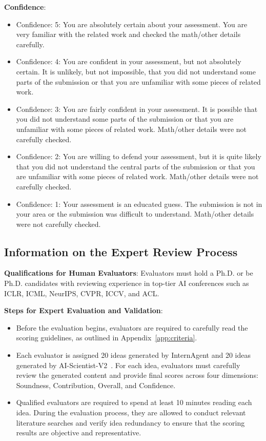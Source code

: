 \documentclass{article}
\begin{document}
\textbf{Confidence}:
\begin{itemize}
  \item Confidence: 5: You are absolutely certain about your assessment. You are very familiar with the related work and checked the math/other details carefully.
  \item Confidence: 4: You are confident in your assessment, but not absolutely certain. It is unlikely, but not impossible, that you did not understand some parts of the submission or that you are unfamiliar with some pieces of related work.
  \item Confidence: 3: You are fairly confident in your assessment. It is possible that you did not understand some parts of the submission or that you are unfamiliar with some pieces of related work. Math/other details were not carefully checked.
  \item Confidence: 2: You are willing to defend your assessment, but it is quite likely that you did not understand the central parts of the submission or that you are unfamiliar with some pieces of related work. Math/other details were not carefully checked.
  \item Confidence: 1: Your assessment is an educated guess. The submission is not in your area or the submission was difficult to understand. Math/other details were not carefully checked.
\end{itemize}


\subsection{Information on the Expert Review Process}

\textbf{Qualifications for Human Evaluators}: Evaluators must hold a Ph.D. or be Ph.D. candidates with reviewing experience in top-tier AI conferences such as ICLR, ICML, NeurIPS, CVPR, ICCV, and ACL.

\textbf{Steps for Expert Evaluation and Validation}:
\begin{itemize}
    \item Before the evaluation begins, evaluators are required to carefully read the scoring guidelines, as outlined in Appendix~\ref{app:criteria}.
    
    \item Each evaluator is assigned 20 ideas generated by InternAgent and 20 ideas generated by AI-Scientist-V2~\citep{yamada2025ai}. For each idea, evaluators must carefully review the generated content and provide final scores across four dimensions: Soundness, Contribution, Overall, and Confidence.

    \item Qualified evaluators are required to spend at least 10 minutes reading each idea. During the evaluation process, they are allowed to conduct relevant literature searches and verify idea redundancy to ensure that the scoring results are objective and representative.

\end{itemize}
\end{document}
